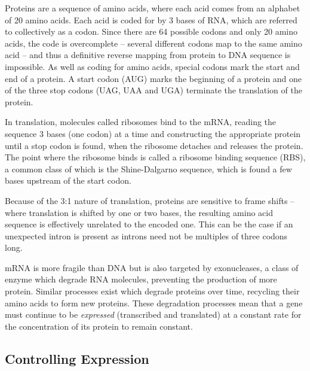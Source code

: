 Proteins are a sequence of amino acids, where each acid comes from an alphabet
of 20 amino acids.
Each acid is coded for by 3 bases of RNA, which are referred to collectively 
as a codon.
Since there are 64 possible codons and only 20 amino acids, the code is
overcomplete -- several different codons map to the same amino acid -- and
thus a definitive reverse mapping from protein to DNA sequence is impossible.
As well as coding for amino acids, special codons mark the start and end of a
protein.
A start codon (AUG) marks the beginning of a protein and one of the three stop 
codons (UAG, UAA and UGA) terminate the translation of the protein.

In translation, molecules called ribosomes bind to the mRNA, reading the
sequence 3 bases (one codon) at a time and constructing the appropriate protein
until a stop codon is found, when the ribosome detaches and releases the
protein.
The point where the ribosome binds is called a ribosome binding sequence (RBS),
a common class of which is the Shine-Dalgarno sequence, which is found a few 
bases upstream of the start codon.

Because of the 3:1 nature of translation, proteins are sensitive to frame
shifts -- where translation is shifted by one or two bases, the resulting amino
acid sequence is effectively unrelated to the encoded one.
This can be the case if an unexpected intron is present as introns need not be 
multiples of three codons long.

mRNA is more fragile than DNA but is also targeted by exonucleases, a class of
enzyme which degrade RNA molecules, preventing the production of more protein.
Similar processes exist which degrade proteins over time, recycling their amino
acids to form new proteins.
These degradation processes mean that a gene must continue to be 
\emph{expressed} (transcribed and translated) at a constant rate for the 
concentration of its protein to remain constant.

\subsection{Controlling Expression}
\label{sec:mbio_control}

